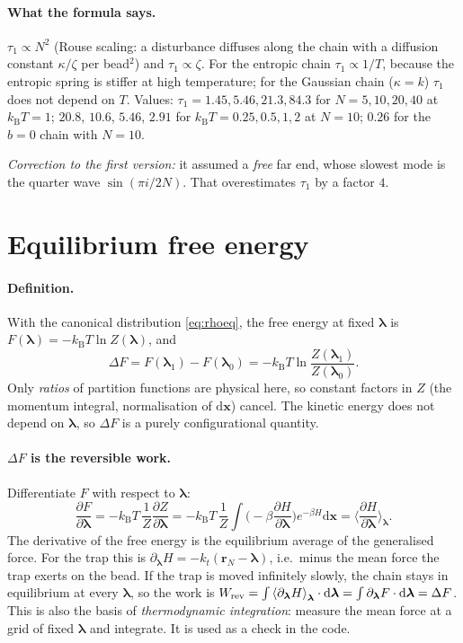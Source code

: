 \documentclass[11pt,a4paper]{article}
\newcommand{\kT}{k_{\mathrm B}T}
\newcommand{\dd}{\mathrm{d}}
\newcommand{\avg}[1]{\left\langle #1\right\rangle}
\newcommand{\lam}{\bm{\lambda}}
\begin{document}
\paragraph{What the formula says.} $\tau_1\propto N^2$ (Rouse scaling: a disturbance diffuses along the chain
with a diffusion constant $\kappa/\zeta$ per bead$^2$) and $\tau_1\propto\zeta$. For the entropic
chain $\tau_1\propto1/T$, because the entropic spring is stiffer at high temperature; for the Gaussian
chain ($\kappa=k$) $\tau_1$ does not depend on $T$. Values: $\tau_1=1.45,5.46,21.3,84.3$ for
$N=5,10,20,40$ at $\kT=1$; $20.8$, $10.6$, $5.46$, $2.91$ for $\kT=0.25,0.5,1,2$ at $N=10$; $0.26$ for the
$b=0$ chain with $N=10$.

\emph{Correction to the first version:} it assumed a \emph{free} far end, whose slowest mode is the
quarter wave $\sin(\pi i/2N)$. That overestimates $\tau_1$ by a factor $4$.

\section{Equilibrium free energy}
\label{sec:F}

\paragraph{Definition.} With the canonical distribution \eqref{eq:rhoeq}, the free energy at fixed
$\lam$ is $F(\lam)=-\kT\ln Z(\lam)$, and
\begin{equation}
\Delta F=F(\lam_1)-F(\lam_0)=-\kT\ln\frac{Z(\lam_1)}{Z(\lam_0)} .
\label{eq:dFdef}
\end{equation}
Only \emph{ratios} of partition functions are physical here, so constant factors in $Z$ (the
momentum integral, normalisation of $\dd\bm x$) cancel. The kinetic energy does not depend on
$\lam$, so $\Delta F$ is a purely configurational quantity.

\paragraph{$\Delta F$ is the reversible work.} Differentiate $F$ with respect to $\lam$:
\begin{equation}
\frac{\partial F}{\partial\lam}=-\kT\,\frac{1}{Z}\frac{\partial Z}{\partial\lam}
=-\kT\,\frac1Z\int\Big(-\beta\frac{\partial H}{\partial\lam}\Big)e^{-\beta H}\dd\bm x
=\Big\langle\frac{\partial H}{\partial\lam}\Big\rangle_{\lam}.
\label{eq:meanforce}
\end{equation}
The derivative of the free energy is the equilibrium average of the generalised force. For the trap
this is $\partial_{\lam}H=-k_t(\bm r_N-\lam)$, i.e.\ minus the mean force the trap exerts on the
bead. If the trap is moved infinitely slowly, the chain stays in equilibrium at every $\lam$, so
the work is
$W_{\rm rev}=\int\avg{\partial_{\lam}H}_{\lam}\cdot\dd\lam=\int\partial_{\lam}F\cdot\dd\lam=\Delta F$.
This is also the basis of \emph{thermodynamic integration}: measure the mean force at a grid of
fixed $\lam$ and integrate. It is used as a check in the code.
\end{document}
